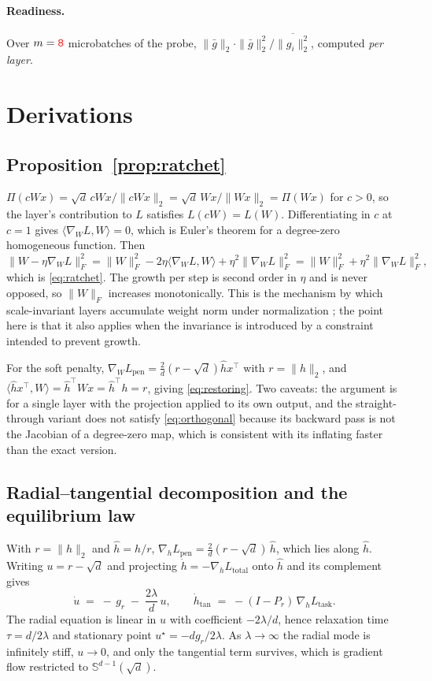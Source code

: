 \documentclass[anon]{opt2026}     %
\newcommand{\PH}[1]{\textcolor{red}{\texttt{#1}}}   %
\begin{document}
\paragraph{Readiness.} Over $m = \PH{8}$ microbatches of the probe,
$\|\bar g\|_2 \cdot \|\bar g\|_2^2 / \overline{\|g_i\|_2^2}$, computed
\emph{per layer}.

\section{Derivations}
\label{app:derivations}

\subsection{Proposition~\ref{prop:ratchet}}
$\Pi(cWx) = \sqrt d\,cWx/\|cWx\|_2 = \sqrt d\,Wx/\|Wx\|_2 = \Pi(Wx)$ for $c > 0$,
so the layer's contribution to $L$ satisfies $L(cW) = L(W)$. Differentiating in
$c$ at $c = 1$ gives $\langle \nabla_W L, W\rangle = 0$, which is Euler's theorem
for a degree-zero homogeneous function. Then
\[
\|W - \eta \nabla_W L\|_F^2
 = \|W\|_F^2 - 2\eta\langle \nabla_W L, W\rangle + \eta^2\|\nabla_W L\|_F^2
 = \|W\|_F^2 + \eta^2\|\nabla_W L\|_F^2 ,
\]
which is \eqref{eq:ratchet}. The growth per step is second order in $\eta$ and is
never opposed, so $\|W\|_F$ increases monotonically. This is the mechanism by
which scale-invariant layers accumulate weight norm under normalization
\citep{vanlaarhoven2017l2, arora2019theoretical}; the point here is that it also
applies when the invariance is introduced by a constraint intended to prevent
growth.

For the soft penalty, $\nabla_W L_{\mathrm{pen}} = \frac{2}{d}(r - \sqrt d)\hat h x^\top$
with $r = \|h\|_2$, and $\langle \hat h x^\top, W\rangle = \hat h^\top W x = \hat h^\top h = r$,
giving \eqref{eq:restoring}. Two caveats: the argument is for a single layer with
the projection applied to its own output, and the straight-through variant does
not satisfy \eqref{eq:orthogonal} because its backward pass is not the Jacobian
of a degree-zero map, which is consistent with its inflating faster than the
exact version.

\subsection{Radial--tangential decomposition and the equilibrium law}
\label{app:flow}
With $r = \|h\|_2$ and $\hat h = h/r$,
$\nabla_h L_{\mathrm{pen}} = \frac{2}{d}(r - \sqrt d)\,\hat h$, which lies along
$\hat h$. Writing $u = r - \sqrt d$ and projecting
$\dot h = -\nabla_h L_{\mathrm{total}}$ onto $\hat h$ and its complement gives
\begin{equation}
\label{eq:radial_ode}
\dot u \;=\; -\,g_r \;-\; \frac{2\lambda}{d}\,u ,
\qquad
\dot h_{\mathrm{tan}} \;=\; -(I - P_r)\,\nabla_h L_{\mathrm{task}} .
\end{equation}
The radial equation is linear in $u$ with coefficient $-2\lambda/d$, hence
relaxation time $\tau = d/2\lambda$ and stationary point
$u^\star = -d g_r / 2\lambda$. As $\lambda \to \infty$ the radial mode is
infinitely stiff, $u \to 0$, and only the tangential term survives, which is
gradient flow restricted to $\mathbb{S}^{d-1}(\sqrt d)$.
\end{document}
